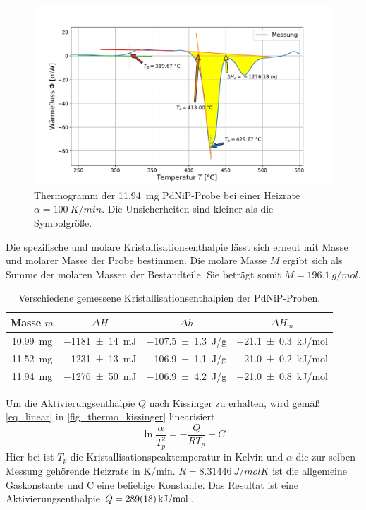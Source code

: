 \documentclass[
	a4paper,
	12pt,
	pagesize,
	ngerman
]{scrartcl}
\begin{document}
	\begin{figure}[H]
			\includegraphics[width=\linewidth]{img/Kalorimetrie_pdnip_100.pdf}
			\caption{
				Thermogramm der \SI{11.94}{mg} PdNiP-Probe bei einer Heizrate $\alpha = \SI{100}{K/min}$.
			Die Unsicherheiten sind kleiner als die Symbolgröße.
			}
			\label{fig_themo_pdnip_100}
	\end{figure}
	Die spezifische und molare Kristallisationsenthalpie lässt sich erneut mit Masse und molarer Masse der Probe bestimmen.
	Die molare Masse $M$ ergibt sich als Summe der molaren Massen der Bestandteile.
	Sie beträgt somit $M=\SI{196.1}{g/mol}$. %
\begin{table}[H]
		\centering
		\begin{tabular}{c | c | c | c  }
			 Masse $m$ &$\Delta H$& $\Delta h$  &$\Delta H_m$ \\ \hline
			 \SI{10.99}{mg}& \SI{-1181+-14}{mJ}&\SI{-107.5+-1.3}{J/g}& \SI{-21.1+-0.3}{kJ/mol} \\
			 \SI{11.52}{mg}& \SI{-1231+-13}{mJ}&\SI{-106.9+-1.1}{J/g}& \SI{-21.0+-0.2}{kJ/mol} \\
			 \SI{11.94}{mg}& \SI{-1276+-50}{mJ}&\SI{-106.9+-4.2}{J/g}& \SI{-21.0+-0.8}{kJ/mol} \\
		\end{tabular}
		\caption{
		Verschiedene gemessene Kristallisationsenthalpien der PdNiP-Proben.
		}
		\label{tb_enthal_pdnip}
\end{table}

	Um die Aktivierungsenthalpie $Q$ nach Kissinger zu erhalten, wird gemäß \cref{eq_linear} in \cref{fig_thermo_kissinger} linearisiert.
	\begin{equation}
		\label{eq_linear}
			\ln{\frac{\alpha}{T_p^2}} = -\frac{Q}{RT_p} + C
	\end{equation}
	Hier bei ist $T_p$ die Kristallisationspeaktemperatur in Kelvin und $\alpha$ die zur selben Messung gehörende Heizrate in \si{K/min}.
	$R=\SI{8.31446}{J/molK}$ ist die allgemeine Gaskonstante und C eine beliebige Konstante.
	Das Resultat ist eine Aktivierungsenthalpie $Q=\SI{289+-18}{kJ/mol}$.
\end{document}
